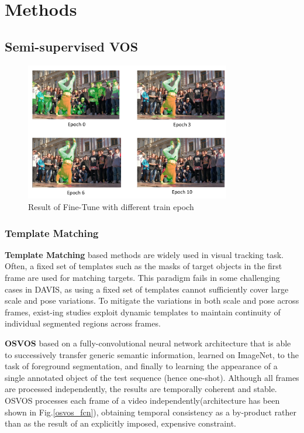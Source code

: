 \section{Methods}

\subsection{Semi-supervised VOS}
\begin{figure}[ht]
    \centering
    \includegraphics[width=0.8\textwidth]{./figure/fine_tune_result.png}
    \caption{Result of Fine-Tune with different train epoch}
    \label{fine_tune_result}
\end{figure}


\subsubsection{Template Matching}
\textbf{Template Matching} based methods are widely used in visual tracking task\cite{OSVOS}\cite{OSVOS-S}\cite{BVS}\cite{PML}. Often, a fixed set of templates such as the masks of target objects in the first frame are used for matching targets. This paradigm fails in some challenging cases in DAVIS, as using a fixed set of templates cannot sufficiently cover large scale and pose variations. To mitigate the variations in both scale and pose across frames, exist-ing studies \cite{PML} exploit dynamic templates to maintain continuity of individual segmented regions across frames.

\textbf{OSVOS}\cite{OSVOS} based on a fully-convolutional neural network architecture that is able to successively transfer generic semantic information, learned on ImageNet\cite{Krizhevsky2012ImageNet}, to the task of foreground segmentation, and finally to learning the appearance of a single annotated object of the test sequence (hence one-shot). Although all frames are processed independently, the results are temporally coherent and stable. OSVOS processes each frame of a video independently(architecture has been shown in Fig.\ref{osvos_fcn}), obtaining temporal consistency as a by-product rather than as the result of an explicitly imposed, expensive constraint. 

